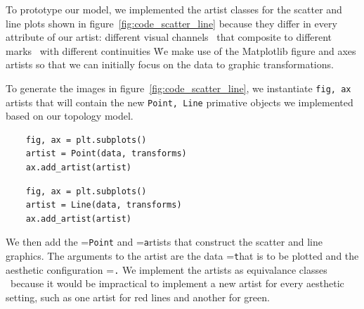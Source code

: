 \documentclass[../main.tex]{subfiles}
\begin{document}
To prototype our model, we implemented the artist classes for the scatter and line plots shown in figure~\ref{fig:code_scatter_line} because they differ in every attribute of our artist: different visual channels \vchannel\ that composite to different marks \vmark\ with different continuities \vindex\.  We make use of the Matplotlib figure and axes artists \cite{hunterArchitectureOpenSource,hunterMatplotlib2DGraphics2007} so that we can initially focus on the data to graphic transformations. 

To generate the images in figure~\ref{fig:code_scatter_line}, we instantiate \texttt{fig, ax} artists that will contain the new \texttt{Point, Line} primative objects we implemented based on our topology model. 

\begin{multicols*}{2}
\begin{verbatim}
    fig, ax = plt.subplots()
    artist = Point(data, transforms)
    ax.add_artist(artist)
\end{verbatim}
\columnbreak
\begin{verbatim}
    fig, ax = plt.subplots()
    artist = Line(data, transforms)
    ax.add_artist(artist)
\end{verbatim}
\end{multicols*}

We then add the \vartisteq=\texttt{Point} and  \vartisteq=\texttt artists that construct the scatter and line graphics. The arguments to the artist are the data \dtotal=\texttt that is to be plotted and the aesthetic configuration \vchannel=\texttt. We implement the artists as equivalance classes \vartisteq\ because it would be impractical to implement a new artist for every aesthetic setting, such as one artist for red lines and another for green.


 
\end{document}
